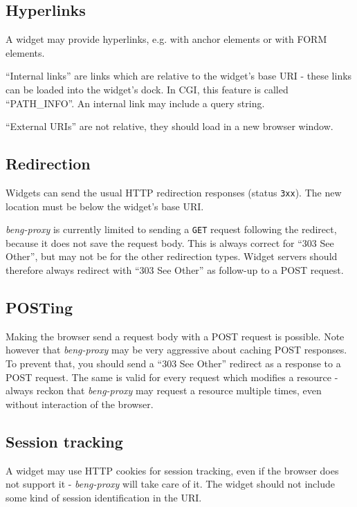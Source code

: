 \documentclass[a4paper,12pt]{article}
\begin{document}
\subsection{Hyperlinks}

A widget may provide hyperlinks, e.g. with anchor elements or with
FORM elements.

``Internal links'' are links which are relative to the widget's base
URI - these links can be loaded into the widget's dock.  In CGI, this
feature is called ``PATH\_INFO''.  An internal link may include a
query string.

``External URIs'' are not relative, they should
load in a new browser window.

\subsection{Redirection}

Widgets can send the usual HTTP redirection responses (status
\texttt{3xx}).  The new location must be below the widget's base URI.

\emph{beng-proxy} is currently limited to sending a \texttt{GET}
request following the redirect, because it does not save the request
body.  This is always correct for ``303 See Other'', but may not be
for the other redirection types.  Widget servers should therefore
always redirect with ``303 See Other'' as follow-up to a POST request.

\subsection{POSTing}

Making the browser send a request body with a POST request is
possible.  Note however that \emph{beng-proxy} may be very aggressive
about caching POST responses.  To prevent that, you should send a
``303 See Other'' redirect as a response to a POST request.  The same
is valid for every request which modifies a resource - always reckon
that \emph{beng-proxy} may request a resource multiple times, even
without interaction of the browser.

\subsection{Session tracking}

A widget may use HTTP cookies for session tracking, even if the
browser does not support it - \emph{beng-proxy} will take care of it.
The widget should not include some kind of session identification in
the URI.
\end{document}
